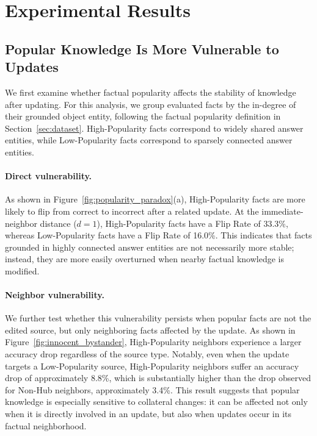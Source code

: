 \section{Experimental Results}
\label{sec:results}


\subsection{Popular Knowledge Is More Vulnerable to Updates}
\label{subsec:popular_vulnerability}

We first examine whether factual popularity affects the stability of knowledge after updating. For this analysis, we group evaluated facts by the in-degree of their grounded object entity, following the factual popularity definition in Section~\ref{sec:dataset}. High-Popularity facts correspond to widely shared answer entities, while Low-Popularity facts correspond to sparsely connected answer entities.

\paragraph{Direct vulnerability.}
As shown in Figure~\ref{fig:popularity_paradox}(a), High-Popularity facts are more likely to flip from correct to incorrect after a related update. At the immediate-neighbor distance ($d=1$), High-Popularity facts have a Flip Rate of 33.3\%, whereas Low-Popularity facts have a Flip Rate of 16.0\%. This indicates that facts grounded in highly connected answer entities are not necessarily more stable; instead, they are more easily overturned when nearby factual knowledge is modified.

\paragraph{Neighbor vulnerability.}
We further test whether this vulnerability persists when popular facts are not the edited source, but only neighboring facts affected by the update. As shown in Figure~\ref{fig:innocent_bystander}, High-Popularity neighbors experience a larger accuracy drop regardless of the source type. Notably, even when the update targets a Low-Popularity source, High-Popularity neighbors suffer an accuracy drop of approximately 8.8\%, which is substantially higher than the drop observed for Non-Hub neighbors, approximately 3.4\%. This result suggests that popular knowledge is especially sensitive to collateral changes: it can be affected not only when it is directly involved in an update, but also when updates occur in its factual neighborhood.

